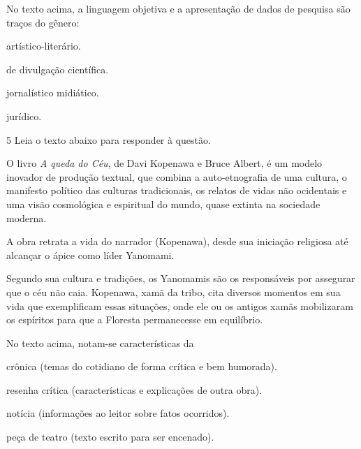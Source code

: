 No texto acima, a linguagem objetiva e a apresentação de dados de pesquisa são traços do 
gênero:

\begin{escolha}

    \item artístico-literário.

    \item de divulgação científica.

    \item jornalístico midiático.

    \item jurídico.

\end{escolha}

\num{5} Leia o texto abaixo para responder à questão. 

\begin{myquote}

O livro \textit{A queda do Céu}, de Davi Kopenawa e Bruce Albert, é um modelo
inovador de produção textual, que combina a auto-etnografia de uma
cultura, o manifesto político das culturas tradicionais, os relatos de
vidas não ocidentais e uma visão cosmológica e espiritual do mundo,
quase extinta na sociedade moderna.

A obra retrata a vida do narrador (Kopenawa), desde sua iniciação
religiosa até alcançar o ápice como líder Yanomami.

Segundo sua cultura e tradições, os Yanomamis são os responsáveis por
assegurar que o céu não caia. Kopenawa, xamã da tribo, cita diversos
momentos em sua vida que exemplificam essas situações, onde ele ou os
antigos xamãs mobilizaram os espíritos para que a Floresta permanecesse
em equilíbrio.


\end{myquote}


No texto acima, notam-se características da

\begin{escolha}

    \item crônica (temas do cotidiano de forma crítica e bem humorada).

    \item resenha crítica (características e explicações de outra obra).

    \item notícia (informações ao leitor sobre fatos ocorridos).

    \item peça de teatro (texto escrito para ser encenado). 

\end{escolha}

